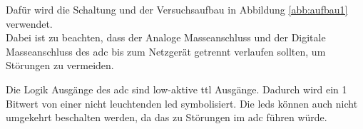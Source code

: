 \documentclass[12pt, a4paper, ngerman]{article}
\begin{document}
Dafür wird die Schaltung %
und der Versuchsaufbau in Abbildung \ref{abb:aufbau1} verwendet. \\
Dabei ist zu beachten, dass der Analoge Masseanschluss und der Digitale Masseanschluss des \ac{adc}
bis zum Netzgerät getrennt verlaufen sollten, um Störungen zu vermeiden.

Die Logik Ausgänge des \ac{adc} sind low-aktive \ac{ttl} Ausgänge.
Dadurch wird ein 1 Bitwert von einer nicht leuchtenden \ac{led} symbolisiert.
Die \ac{led}s können auch nicht umgekehrt beschalten werden, da das zu Störungen im \ac{adc} führen würde.

\end{document}

